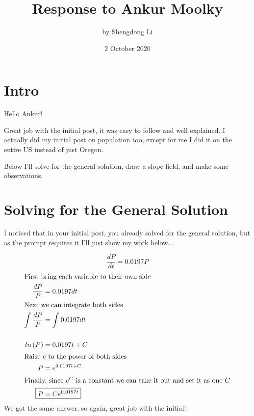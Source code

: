 \documentclass[12pt]{article}
\begin{document}
\title{Response to Ankur Moolky}
\author{by Shengdong Li}
\date{2 October 2020}
\maketitle

\section{Intro}

Hello Ankur!

Great job with the initial post, it was easy to follow and well explained. I actually did my initial post on population too, except for me I did it on the entire US instead of just Oregon.

Below I'll solve for the general solution, draw a slope field, and make some observations.

\section{Solving for the General Solution}
I noticed that in your initial post, you already solved for the general solution, but as the prompt requires it I'll just show my work below...

$$
  \frac{dP}{dt}=0.0197P
$$
\begin{align}
  \intertext{First bring each variable to their own side}
  \frac{dP}{P}             & =0.0197dt             \\
  \intertext{Next we can integrate both sides}
  \int_{ }^{ }\frac{dP}{P} & =\int_{ }^{ }0.0197dt \\
  \\ln\left(P\right)&=0.0197t+C\\
  \intertext{Raise $e$ to the power of both sides}
  P                        & =e^{0.0197t+C}        \\
  \intertext{Finally, since $e^C$ is a constant we can take it out and set it as one $C$}
  \Aboxed{P                & =Ce^{0.0197t}}        \\
\end{align}
We got the same answer, so again, great job with the initial!
\end{document}
